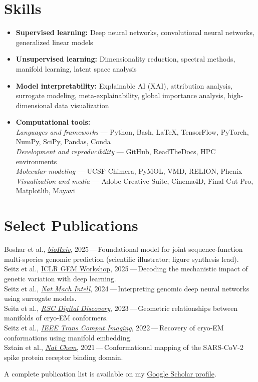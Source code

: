 \documentclass[11pt]{article}
\begin{document}
\section*{\textcolor{Mahogany}{Skills}}
{\small
\begin{itemize}
    \item \textbf{Supervised learning:} Deep neural networks, convolutional neural networks, generalized linear models
    \item \textbf{Unsupervised learning:} Dimensionality reduction, spectral methods, manifold learning, latent space analysis
    \item \textbf{Model interpretability:} Explainable AI (XAI), attribution analysis, surrogate modeling, meta-explainability, global importance analysis, high-dimensional data visualization
    \item \textbf{Computational tools:} \\
    \textit{Languages and frameworks} — Python, Bash, LaTeX, TensorFlow, PyTorch, NumPy, SciPy, Pandas, Conda \\
    \textit{Development and reproducibility} — GitHub, ReadTheDocs, HPC environments \\
    \textit{Molecular modeling} — UCSF Chimera, PyMOL, VMD, RELION, Phenix \\
    \textit{Visualization and media} — Adobe Creative Suite, Cinema4D, Final Cut Pro, Matplotlib, Mayavi
\end{itemize}
}

\section*{\textcolor{Mahogany}{Select Publications}}
{\small
Boshar et al., \textit{\href{https://www.biorxiv.org/content/early/2025/12/25/2025.12.22.695963}{bioRxiv}}, 2025\,---\,Foundational model for joint sequence-function multi-species genomic prediction (scientific illustrator; figure synthesis lead).\\
Seitz et al., \href{https://openreview.net/forum?id=PtjMeyHcTt}{ICLR GEM Workshop}, 2025\,---\,Decoding the mechanistic impact of genetic variation with deep learning.\\
Seitz et al., \textit{\href{https://www.nature.com/articles/s42256-024-00851-5}{Nat Mach Intell}}, 2024\,---\,Interpreting genomic deep neural networks using surrogate models.\\
Seitz et al., \textit{\href{https://pubs.rsc.org/en/content/articlelanding/2023/dd/d2dd00128d}{RSC Digital Discovery}}, 2023\,---\,Geometric relationships between manifolds of cryo-EM conformers.\\
Seitz et al., \textit{\href{https://ieeexplore.ieee.org/document/9773954}{IEEE Trans Comput Imaging}}, 2022\,---\,Recovery of cryo-EM conformations using manifold embedding.\\
Sztain et al., \textit{\href{https://www.nature.com/articles/s41557-021-00758-3}{Nat Chem}}, 2021\,---\,Conformational mapping of the SARS-CoV-2 spike protein receptor binding domain.

A complete publication list is available on my \href{https://scholar.google.com/citations?user=S9FdJf4AAAAJ&hl=en}{Google Scholar profile}.
}
\end{document}
